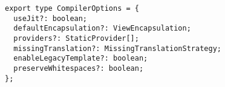\begin{verbatim}
export type CompilerOptions = {
  useJit?: boolean;
  defaultEncapsulation?: ViewEncapsulation;
  providers?: StaticProvider[];
  missingTranslation?: MissingTranslationStrategy;
  enableLegacyTemplate?: boolean;
  preserveWhitespaces?: boolean;
};
\end{verbatim}
